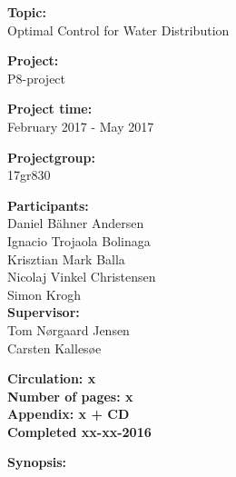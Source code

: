 \begin{minipage}[t]{0.48\textwidth}
\textbf{Topic:} \\[5pt]\bigskip\hspace{2ex}
Optimal Control for Water Distribution

\textbf{Project:} \\[5pt]\bigskip\hspace{2ex}
P8-project

\textbf{Project time:} \\[5pt]\bigskip\hspace{2ex}
February 2017 - May 2017

\textbf{Projectgroup:} \\[5pt]\bigskip\hspace{2ex}
17gr830	

\textbf{Participants:} \\[5pt]\hspace*{2ex}
Daniel Bähner Andersen \\\hspace*{2ex}
Ignacio Trojaola Bolinaga \\\hspace*{2ex} 
Krisztian Mark Balla \\\hspace*{2ex}
Nicolaj Vinkel Christensen \\\hspace*{2ex}
Simon Krogh \\

\textbf{Supervisor:} \\[5pt]\hspace*{2ex}
Tom Nørgaard Jensen \\\hspace*{2ex}
Carsten Kallesøe \\\bigskip\hspace{2ex}

\vspace*{3.5cm}

\textbf{Circulation: x} \\
\textbf{Number of pages: x}\\
\textbf{Appendix: x + CD} \\
\textbf{Completed xx-xx-2016}\\
\end{minipage}
\hfill
\begin{minipage}[t]{0.483\textwidth}
\textbf{Synopsis:} \\[5pt]
\fbox{\parbox{7cm}{\bigskip\bigskip}}
\end{minipage}

\vfill